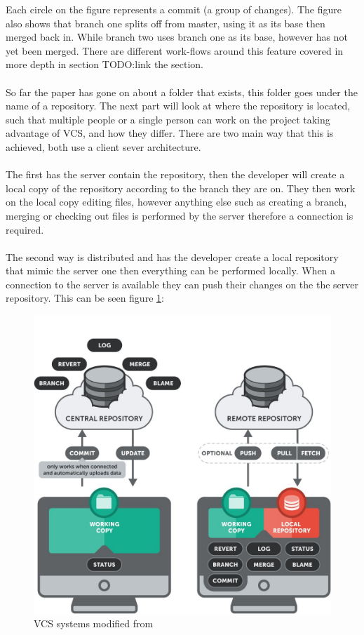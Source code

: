 Each circle on the figure represents a commit (a group of changes). The figure also shows that branch one splits off from master, using it as its base then merged back in. While branch two uses branch one as its base, however has not yet been merged. There are different work-flows around this feature covered in more depth in section TODO:link the section.
\\\\
So far the paper has gone on about a folder that exists, this folder goes under the name of a repository. The next part will look at where the repository is located, such that multiple people or a single person can work on the project taking advantage of VCS, and how they differ. There are two main way that this is achieved, both use a client sever architecture. 
\\\\
The first has the server contain the repository, then the developer will create a local copy of the repository according to the branch they are on. They then work on the local copy editing files, however anything else such as creating a branch, merging or checking out files is performed by the server therefore a connection is required.
\\\\
The second way is distributed and has the developer create a local repository that mimic the server one then everything can be performed locally. When a connection to the server is available they can push their changes on the the server repository. This can be seen figure \ref{fig:vcs_systems}:

\begin{figure}[H]
	\centering
	\includegraphics[scale=0.30]{images/systems.jpg}
	\caption{VCS systems modified from \cite{VCSSYSTEMS}}
	\label{fig:vcs_systems}
\end{figure}

